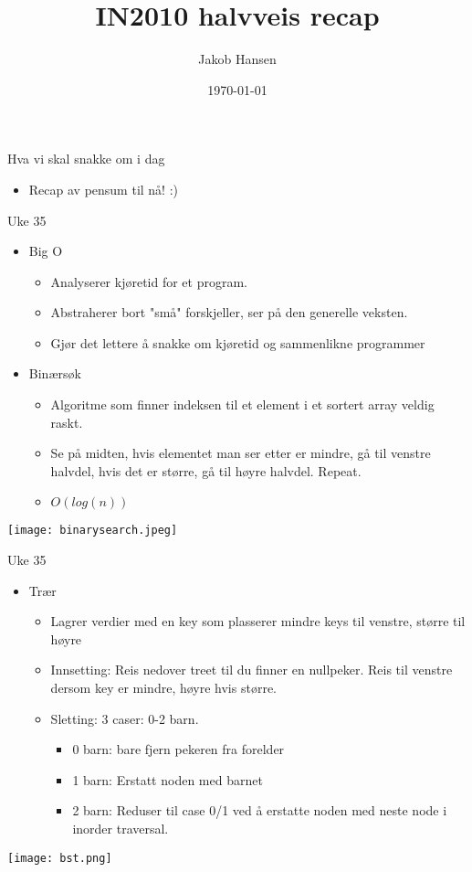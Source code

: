 \documentclass[norsk]{beamer}
\title{IN2010 halvveis recap}
\author{Jakob Hansen}
\date{\today}
\begin{document}
	\frame{\titlepage}
	\begin{frame}{Hva vi skal snakke om i dag}
		\begin{itemize}
			\item Recap av pensum til nå! :)
		\end{itemize}
    \end{frame}

	\begin{frame}{Uke 35}
		\begin{itemize}
			\item Big O
				\begin{itemize}
					\item Analyserer kjøretid for et program.
					\item Abstraherer bort "små" forskjeller, ser på den generelle
						veksten.
					\item Gjør det lettere å snakke om kjøretid og sammenlikne programmer
				\end{itemize}
			\item Binærsøk
				\begin{itemize}
					\item Algoritme som finner indeksen til et element i et sortert array
						veldig raskt.
					\item Se på midten, hvis elementet man ser etter er mindre, gå til
						venstre halvdel, hvis det er større, gå til høyre halvdel.
						Repeat.
					\item $O(log(n))$
				\end{itemize}
		\end{itemize}
		\begin{center}
			\texttt{[image: binarysearch.jpeg]}
		\end{center}
	\end{frame}

	\begin{frame}{Uke 35}
			\begin{itemize}
				\item Trær
					\begin{itemize}
						\item Lagrer verdier med en key som plasserer mindre keys til
							venstre, større til høyre
						\item Innsetting: Reis nedover treet til du finner en nullpeker.
							Reis til venstre dersom key er mindre, høyre hvis større.
						\item Sletting: 3 caser: 0-2 barn.
							\begin{itemize}
								\item 0 barn: bare fjern pekeren fra forelder
								\item 1 barn: Erstatt noden med barnet
								\item 2 barn: Reduser til case 0/1 ved å erstatte noden med
									neste node i inorder traversal.
							\end{itemize}
					\end{itemize}
			\end{itemize}

			\begin{center}
				\texttt{[image: bst.png]}
			\end{center}
	\end{frame}
\end{document}
